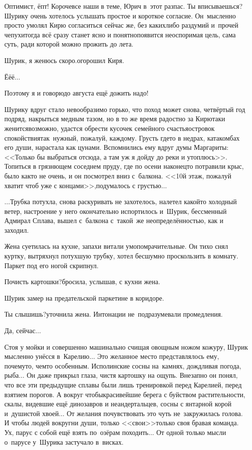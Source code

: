 {	\diagdash Оптимист, ёпт! Короче\mdash все наши в теме, Юрич в~этот раз\mdash пас. Ты вписываешься?\mdash Шурику очень хотелось услышать простое и короткое согласие. Он~мысленно просто умолял Кирю согласиться сейчас же, без каких\sdash либо раздумий и~прочей чепухи\mdash тогда всё сразу станет ясно и понятно\mdash появится неоспоримая цель, сама суть, ради которой можно прожить до лета.
	
	\diagdash Шурик, я женюсь скоро.\mdash огорошил Киря.
	
	\diagdash Ё\sdash ё\sdash ё$\ldots$
	
	\diagdash Поэтому я и говорю\mdash до августа ещё дожить надо!
	
	Шурику вдруг стало невообразимо горько, что поход может снова, четвёртый год подряд, накрыться медным тазом, но в то же время радостно за Кирю\mdash таки женится\mdash возможно, удастся обрести кусочек семейного счастья\mdash островок спокойствия\mdash так~нужный, пожалуй, каждому. Грусть где\sdash то в недрах, катакомбах его души, нарастала как цунами. Вспомнились ему вдруг думы Маргариты: <<Только бы выбраться отсюда, а там уж я дойду до реки и утоплюсь>>\cite{МастерМаргарита}. Топиться в грязнющем соседнем пруду, где по осени наконец\sdash то потравили крыс, было как\sdash то не очень, и он посмотрел вниз с~балкона. <<10\sdash й этаж, пожалуй хватит чтоб уже с концами>>,\mdash подумалось с грустью$\ldots$
	
	$\ldots$Трубка потухла, снова раскуривать не захотелось, налетел какой\sdash то холодный ветер, настроение у него окончательно испортилось и~Шурик, бессменный Адмирал Сплава, вышел с~балкона с~такой~же неопределённостью, как и заходил.
	
	Жена суетилась на кухне, запахи витали умопомрачительные. Он тихо снял куртку, вытряхнул потухшую трубку, хотел бесшумно проскользить в комнату. Паркет под его ногой скрипнул. 
	
	\diagdash Почисть картошки?\mdash бросила, услышав, с кухни жена.
	
	Шурик замер на предательской паркетине в коридоре.
	
	\diagdash Ты слышишь?\mdash уточнила жена. Интонации не~подразумевали промедления.
	
	\diagdash Да, сейчас$\ldots$
	
	Стоя у мойки и совершенно машинально счищая овощным ножом кожуру, Шурик мысленно унёсся в~Карелию$\ldots$ Это желанное место представлялось ему, почему\sdash то, чем\sdash то особенным. Исполинские сосны на~камнях, дождливая погода, рыба$\ldots$ Он даже прикрыл глаза, чистя картошку на ощупь. Внезапно он понял, что все эти предыдущие сплавы были лишь тренировкой перед Карелией, перед взятием порогов. А вокруг чтобы\mdash красивейшие берега с буйством растительности, скалы, видевшие ещё динозавров и неандертальцев, сосны с янтарной корой и~душистой хвоей$\ldots$ От желания почувствовать это чуть не~закружилась голова. И чтобы людей вокруг\mdash ни души, только <<свои>>\mdash только своя бравая команда. Ух, парус с собой ещё взять по~озёрам походить$\ldots$ От одной только мысли о~парусе у~Шурика застучало в~висках.
	
}

